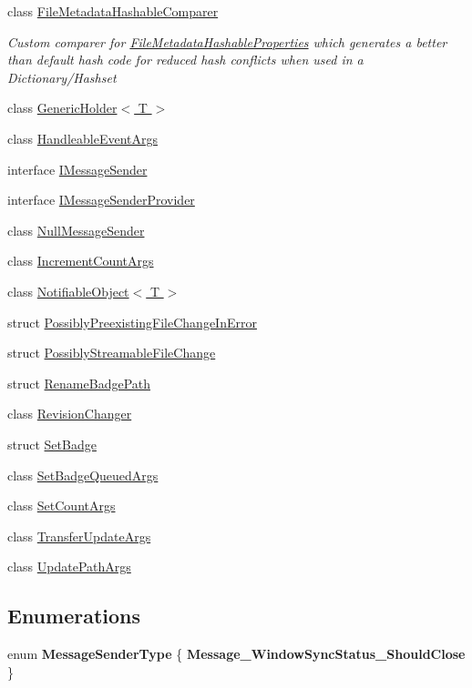 \begin{DoxyCompactItemize}
class \hyperlink{class_cloud_api_public_1_1_model_1_1_file_metadata_hashable_comparer}{File\-Metadata\-Hashable\-Comparer}
\begin{DoxyCompactList}\small\item\em Custom comparer for \hyperlink{struct_cloud_api_public_1_1_model_1_1_file_metadata_hashable_properties}{File\-Metadata\-Hashable\-Properties} which generates a better than default hash code for reduced hash conflicts when used in a Dictionary/\-Hashset \end{DoxyCompactList}\item 
class \hyperlink{class_cloud_api_public_1_1_model_1_1_generic_holder_3_01_t_01_4}{Generic\-Holder$<$ T $>$}
\item 
class \hyperlink{class_cloud_api_public_1_1_model_1_1_handleable_event_args}{Handleable\-Event\-Args}
\item 
interface \hyperlink{interface_cloud_api_public_1_1_model_1_1_i_message_sender}{I\-Message\-Sender}
\item 
interface \hyperlink{interface_cloud_api_public_1_1_model_1_1_i_message_sender_provider}{I\-Message\-Sender\-Provider}
\item 
class \hyperlink{class_cloud_api_public_1_1_model_1_1_null_message_sender}{Null\-Message\-Sender}
\item 
class \hyperlink{class_cloud_api_public_1_1_model_1_1_increment_count_args}{Increment\-Count\-Args}
\item 
class \hyperlink{class_cloud_api_public_1_1_model_1_1_notifiable_object_3_01_t_01_4}{Notifiable\-Object$<$ T $>$}
\item 
struct \hyperlink{struct_cloud_api_public_1_1_model_1_1_possibly_preexisting_file_change_in_error}{Possibly\-Preexisting\-File\-Change\-In\-Error}
\item 
struct \hyperlink{struct_cloud_api_public_1_1_model_1_1_possibly_streamable_file_change}{Possibly\-Streamable\-File\-Change}
\item 
struct \hyperlink{struct_cloud_api_public_1_1_model_1_1_rename_badge_path}{Rename\-Badge\-Path}
\item 
class \hyperlink{class_cloud_api_public_1_1_model_1_1_revision_changer}{Revision\-Changer}
\item 
struct \hyperlink{struct_cloud_api_public_1_1_model_1_1_set_badge}{Set\-Badge}
\item 
class \hyperlink{class_cloud_api_public_1_1_model_1_1_set_badge_queued_args}{Set\-Badge\-Queued\-Args}
\item 
class \hyperlink{class_cloud_api_public_1_1_model_1_1_set_count_args}{Set\-Count\-Args}
\item 
class \hyperlink{class_cloud_api_public_1_1_model_1_1_transfer_update_args}{Transfer\-Update\-Args}
\item 
class \hyperlink{class_cloud_api_public_1_1_model_1_1_update_path_args}{Update\-Path\-Args}
\end{DoxyCompactItemize}
\subsection*{Enumerations}
\begin{DoxyCompactItemize}
\item 
enum {\bfseries Message\-Sender\-Type} \{ {\bfseries Message\-\_\-\-Window\-Sync\-Status\-\_\-\-Should\-Close}
 \}
\end{DoxyCompactItemize}
